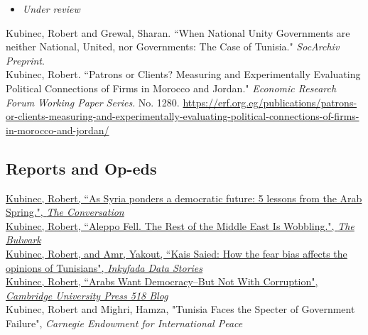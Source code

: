 \documentclass[11pt, a4paper]{article}
\newcommand{\years}[1]{\marginnote{\scriptsize #1}}
\begin{document}
\begin{itemize}
	\item \emph{Under review}
\end{itemize}

\years{2019} Kubinec, Robert and Grewal, Sharan. ``When National Unity Governments are neither National, United, nor Governments: The Case of Tunisia." \emph{SocArchiv Preprint}. \\

\years{2018} Kubinec, Robert. ``Patrons or Clients? Measuring and Experimentally Evaluating Political Connections of Firms in Morocco and Jordan." \emph{Economic Research Forum Working Paper Series}. No. 1280. \url{https://erf.org.eg/publications/patrons-or-clients-measuring-and-experimentally-evaluating-political-connections-of-firms-in-morocco-and-jordan/}\\

\subsection*{Reports and Op-eds}
\noindent

\years{2025}\href{https://theconversation.com/as-syria-ponders-a-democratic-future-5-lessons-from-the-arab-spring-246203}{Kubinec, Robert, ``As Syria ponders a democratic future: 5 lessons from the Arab Spring.", \emph{The Conversation}}\\

\years{2024}\href{https://www.thebulwark.com/p/aleppo-fell-the-rest-of-the-middle-east-is-wobbling/}{Kubinec, Robert, ``Aleppo Fell. The Rest of the Middle East Is Wobbling.", \emph{The Bulwark}}\\

\years{2023}\href{https://inkyfada.com/en/2023/10/27/kais-saied-fear-bias-opinions-tunisians/}{Kubinec, Robert, and Amr, Yakout, ``Kais Saied: How the fear bias affects the opinions of Tunisians", \emph{Inkyfada Data Stories}}\\

\years{2023}\href{https://www.cambridgeblog.org/2023/07/arabs-want-democracy-but-not-with-corruption/}{Kubinec, Robert, ``Arabs Want Democracy--But Not With Corruption", \emph{Cambridge University Press 518 Blog}}\\

\years{2022}Kubinec, Robert and Mighri, Hamza, "Tunisia Faces the Specter of Government Failure", \emph{Carnegie Endowment for International Peace}

\newpage
\end{document}
